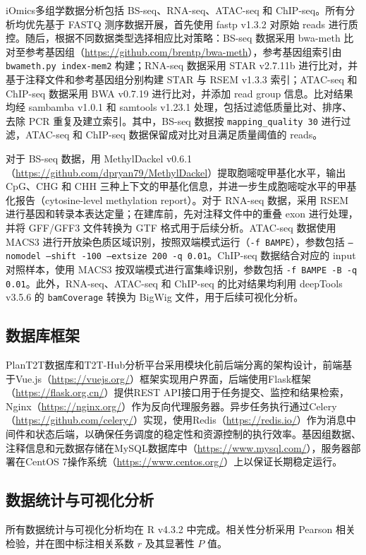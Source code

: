 iOmics多组学数据分析包括 BS-seq、RNA-seq、ATAC-seq 和 ChIP-seq。所有分析均优先基于 FASTQ 测序数据开展，首先使用 fastp v1.3.2 对原始 reads 进行质控\cite{chen2018fastp}。随后，根据不同数据类型选择相应比对策略：BS-seq 数据采用 bwa-meth 比对至参考基因组（\url{https://github.com/brentp/bwa-meth}），参考基因组索引由 \texttt{bwameth.py index-mem2} 构建；RNA-seq 数据采用 STAR v2.7.11b 进行比对，并基于注释文件和参考基因组分别构建 STAR 与 RSEM v1.3.3 索引\cite{dobin2013star, li2011rsem}；ATAC-seq 和 ChIP-seq 数据采用 BWA v0.7.19 进行比对\cite{jung2022bwa}，并添加 read group 信息。比对结果均经 sambamba v1.0.1 和 samtools v1.23.1 处理\cite{tarasov2015sambamba, li2009sequence}，包括过滤低质量比对、排序、去除 PCR 重复及建立索引。其中，BS-seq 数据按 \texttt{mapping\_quality 30} 进行过滤，ATAC-seq 和 ChIP-seq 数据保留成对比对且满足质量阈值的 reads。

对于 BS-seq 数据，用 MethylDackel v0.6.1（\url{https://github.com/dpryan79/MethylDackel}）提取胞嘧啶甲基化水平，输出 CpG、CHG 和 CHH 三种上下文的甲基化信息，并进一步生成胞嘧啶水平的甲基化报告（cytosine-level methylation report）。对于 RNA-seq 数据，采用 RSEM 进行基因和转录本表达定量；在建库前，先对注释文件中的重叠 exon 进行处理，并将 GFF/GFF3 文件转换为 GTF 格式用于后续分析。ATAC-seq 数据使用 MACS3 进行开放染色质区域识别\cite{zhang2008model}，按照双端模式运行（\texttt{-f BAMPE}），参数包括 \texttt{--nomodel --shift -100 --extsize 200 -q 0.01}。ChIP-seq 数据结合对应的 input 对照样本，使用 MACS3 按双端模式进行富集峰识别，参数包括 \texttt{-f BAMPE -B -q 0.01}。此外，RNA-seq、ATAC-seq 和 ChIP-seq 的比对结果均利用 deepTools v3.5.6 的 \texttt{bamCoverage} 转换为 BigWig 文件\cite{ramirez2014deeptools}，用于后续可视化分析。

\subsection{数据库框架}
PlanT2T数据库和T2T-Hub分析平台采用模块化前后端分离的架构设计，前端基于Vue.js（\url{https://vuejs.org/}）框架实现用户界面，后端使用Flask框架（\url{https://flask.org.cn/}）提供REST API接口用于任务提交、监控和结果检索，Nginx（\url{https://nginx.org/}）作为反向代理服务器。异步任务执行通过Celery（\url{https://github.com/celery/}）实现，使用Redis（\url{https://redis.io/}）作为消息中间件和状态后端，以确保任务调度的稳定性和资源控制的执行效率。基因组数据、注释信息和元数据存储在MySQL数据库中（\url{https://www.mysql.com/}），服务器部署在CentOS 7操作系统（\url{https://www.centos.org/}）上以保证长期稳定运行。

\subsection{数据统计与可视化分析}
所有数据统计与可视化分析均在 R v4.3.2 中完成。相关性分析采用 Pearson 相关检验，并在图中标注相关系数 \(r\) 及其显著性 \(P\) 值。

